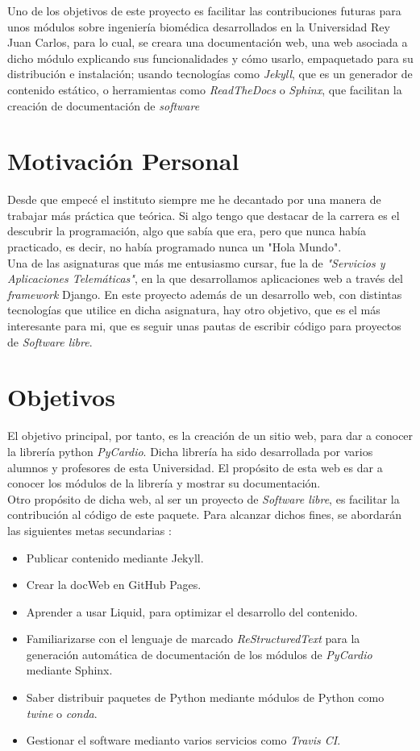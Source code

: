Uno de los objetivos de este proyecto es facilitar las contribuciones futuras para unos módulos sobre ingeniería biomédica desarrollados en la Universidad Rey Juan Carlos, para lo cual, se creara una documentación web, una web asociada a dicho módulo explicando sus funcionalidades y cómo usarlo, empaquetado para su distribución e instalación; usando tecnologías como \emph{Jekyll}, que es un generador de contenido estático, o herramientas como \emph{ReadTheDocs} o \emph{Sphinx}, que facilitan la creación de documentación de \emph{software}


\section{Motivación Personal}
\label{sec:mot}
Desde que empecé el instituto siempre me he decantado por una manera de trabajar más práctica que teórica. Si algo tengo que destacar de la carrera es el descubrir la programación, algo que sabía que era, pero que nunca había practicado, es decir, no había programado nunca un "Hola Mundo". \\
Una de las asignaturas que más me entusiasmo cursar, fue la de \emph{"Servicios y Aplicaciones Telemáticas"}, en la que desarrollamos aplicaciones web a través del \emph{framework} Django. En este proyecto además de un desarrollo web, con distintas tecnologías que utilice en dicha asignatura, hay otro objetivo, que es el más interesante para mi, que es seguir unas pautas de escribir código para proyectos de \emph{Software libre}.

\section{Objetivos}
\label{sec:objetivos}
El objetivo principal, por tanto, es la creación de un sitio web, para dar a conocer la librería python \emph{PyCardio}. Dicha librería ha sido desarrollada por varios alumnos y profesores de esta Universidad. El propósito de esta web es dar a conocer los módulos de la librería y mostrar su documentación. \\
Otro propósito de dicha web, al ser un proyecto de \emph{Software libre}, es facilitar la contribución al código de este paquete. Para alcanzar dichos fines, se abordarán las siguientes metas secundarias :
\begin{itemize}
    \item Publicar contenido mediante Jekyll.
    \item Crear la docWeb en GitHub Pages.
    \item Aprender a usar Liquid, para optimizar el desarrollo del contenido.
    \item Familiarizarse con el lenguaje de marcado \emph{ReStructuredText} para la generación automática de documentación de los módulos de \emph{PyCardio} mediante Sphinx.
    \item Saber distribuir paquetes de Python mediante módulos de Python como \emph{twine} o \emph{conda}.
    \item Gestionar el software medianto varios servicios como \emph{Travis CI}.
\end{itemize}

